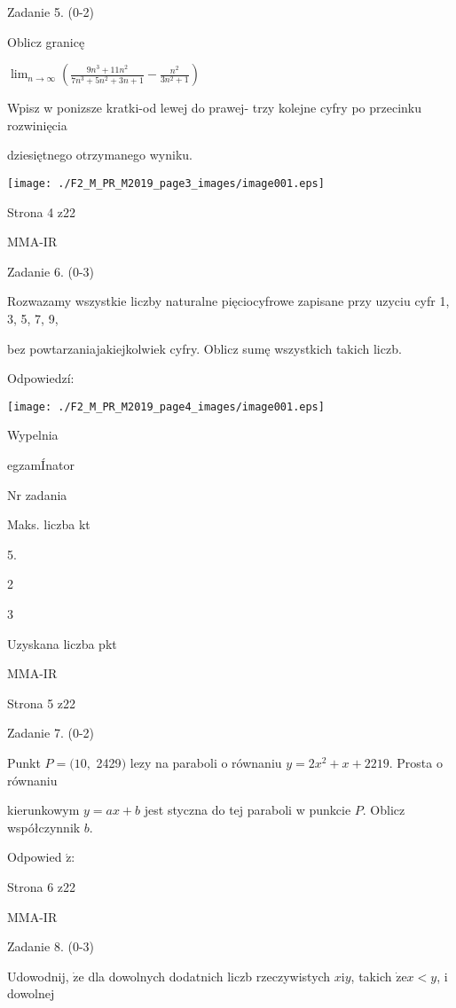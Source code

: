 \documentclass[a4paper,12pt]{article}
\begin{document}
Zadanie 5. (0-2)

Oblicz granicę

$\displaystyle \lim_{n\rightarrow\infty}(\frac{9n^{3}+11n^{2}}{7n^{3}+5n^{2}+3n+1}-\frac{n^{2}}{3n^{2}+1})$

Wpisz w ponizsze kratki-od lewej do prawej- trzy kolejne cyfry po przecinku rozwinięcia

dziesiętnego otrzymanego wyniku.
\begin{center}
\texttt{[image: ./F2\_M\_PR\_M2019\_page3\_images/image001.eps]}
\end{center}
Strona 4 z22

MMA-IR





Zadanie 6. (0-3)

Rozwazamy wszystkie liczby naturalne pięciocyfrowe zapisane przy uzyciu cyfr 1, 3, 5, 7, 9,

bez powtarzaniajakiejkolwiek cyfry. Oblicz sumę wszystkich takich liczb.

Odpowiedzí:
\begin{center}
\texttt{[image: ./F2\_M\_PR\_M2019\_page4\_images/image001.eps]}
\end{center}
Wypelnia

egzamÍnator

Nr zadania

Maks. liczba kt

5.

2

3

Uzyskana liczba pkt

MMA-IR

Strona 5 z22





Zadanie 7. (0-2)

Punkt $P=(10,$ 2429$)$ lezy na paraboli o równaniu $y=2x^{2}+x+2219$. Prosta o równaniu

kierunkowym $y=ax+b$ jest styczna do tej paraboli w punkcie $P$. Oblicz współczynnik $b.$

Odpowied $\acute{\mathrm{z}}$:

Strona 6 z22

MMA-IR





Zadanie 8. (0-3)

Udowodnij, $\dot{\mathrm{z}}\mathrm{e}$ dla dowolnych dodatnich liczb rzeczywistych $x\mathrm{i}y$, takich $\dot{\mathrm{z}}\mathrm{e}x<y$, i dowolnej
\end{document}
